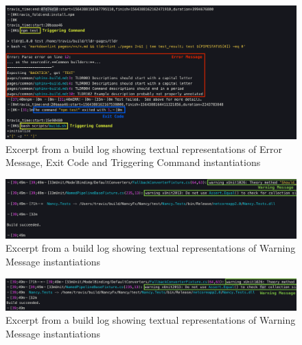 \documentclass[\myrootdir/main.tex]{subfiles}
\begin{document}
\begin{figure}[hp]
	\centering
	\includegraphics[width=\textwidth, clip]{img/log3.png}
	\caption{Excerpt from a build log showing textual representations of Error Message, Exit Code and Triggering Command instantiations}
	\label{fig:log-3}
\end{figure}
\begin{figure}[hp]
	\centering
	\includegraphics[width=\textwidth, clip]{img/log4.png}
	\caption{Excerpt from a build log showing textual representations of Warning Message instantiations}
	\label{fig:log-4}
\end{figure}
\begin{figure}[hp]
	\centering
	\includegraphics[width=\textwidth, clip]{img/log5.png}
	\caption{Excerpt from a build log showing textual representations of Warning Message instantiations}
	\label{fig:log-5}
\end{figure}
\end{document}
